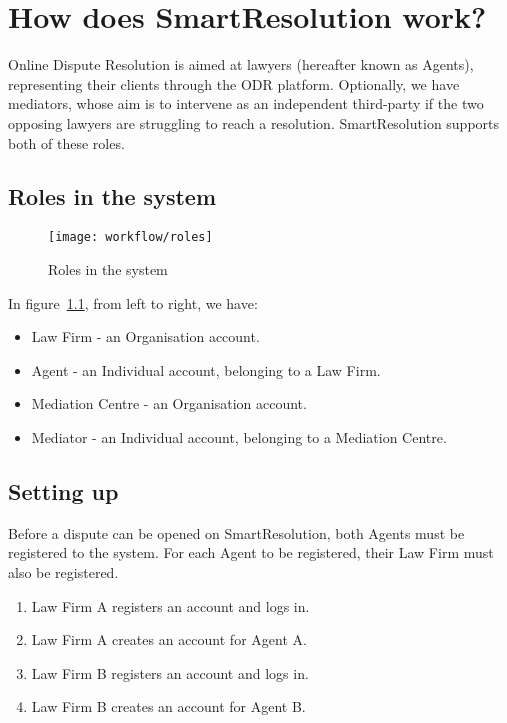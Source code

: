 \chapter{How does SmartResolution work?}\label{appendix:workflow}

Online Dispute Resolution is aimed at lawyers (hereafter known as Agents), representing their clients through the ODR platform. Optionally, we have mediators, whose aim is to intervene as an independent third-party if the two opposing lawyers are struggling to reach a resolution. SmartResolution supports both of these roles.

\section{Roles in the system}

\begin{figure}[ht!]
  \centering
    \ifimages
    \texttt{[image: workflow/roles]}
    \fi
    \caption{Roles in the system}
  \label{workflow:roles}
\end{figure}

In figure~\ref{workflow:roles}, from left to right, we have:

\begin{itemize}
\item Law Firm - an Organisation account.
\item Agent - an Individual account, belonging to a Law Firm.
\item Mediation Centre - an Organisation account.
\item Mediator - an Individual account, belonging to a Mediation Centre.
\end{itemize}

\section{Setting up}

Before a dispute can be opened on SmartResolution, both Agents must be registered to the system. For each Agent to be registered, their Law Firm must also be registered.

\begin{enumerate}
\item Law Firm A registers an account and logs in.
\item Law Firm A creates an account for Agent A.
\item Law Firm B registers an account and logs in.
\item Law Firm B creates an account for Agent B.
\end{enumerate}

